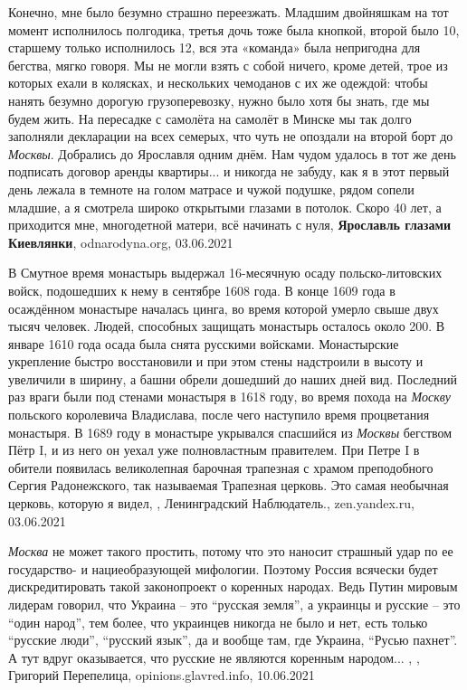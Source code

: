 Конечно, мне было безумно страшно переезжать. Младшим двойняшкам на тот момент
исполнилось полгодика, третья дочь тоже была кнопкой, второй было 10, старшему
только исполнилось 12, вся эта «команда» была непригодна для бегства, мягко
говоря. Мы не могли взять с собой ничего, кроме детей, трое из которых ехали в
колясках,  и нескольких чемоданов с их же одеждой: чтобы нанять безумно дорогую
грузоперевозку, нужно было хотя бы знать, где мы будем жить. На пересадке с
самолёта на самолёт в Минске мы так долго заполняли декларации на всех семерых,
что чуть не опоздали на второй борт до \emph{Москвы}. Добрались до Ярославля
одним днём. Нам чудом удалось в тот же день подписать договор аренды
квартиры... и никогда не забуду, как я в этот первый день лежала в темноте на
голом матрасе и чужой подушке, рядом сопели младшие, а я смотрела широко
открытыми глазами в потолок. Скоро 40 лет, а приходится мне, многодетной
матери, всё начинать с нуля,
\textbf{Ярославль глазами Киевлянки},
odnarodyna.org, 03.06.2021

В Смутное время монастырь выдержал 16-месячную осаду польско-литовских войск,
подошедших к нему в сентябре 1608 года. В конце 1609 года в осаждённом
монастыре началась цинга, во время которой умерло свыше двух тысяч человек.
Людей, способных защищать монастырь осталось около 200. В январе 1610 года
осада была снята русскими войсками. Монастырские укрепление быстро восстановили
и при этом стены надстроили в высоту и увеличили в ширину, а башни обрели
дошедший до наших дней вид. Последний раз враги были под стенами монастыря в
1618 году, во время похода на \emph{Москву} польского королевича Владислава,
после чего наступило время процветания монастыря. В 1689 году в монастыре
укрывался спасшийся из \emph{Москвы} бегством Пётр I, и из него он уехал уже
полновластным правителем. При Петре I в обители появилась великолепная барочная
трапезная с храмом преподобного Сергия Радонежского, так называемая Трапезная
церковь. Это самая необычная церковь, которую я видел,
, Ленинградский Наблюдатель., zen.yandex.ru, 03.06.2021

\emph{Москва} не может такого простить, потому что это наносит страшный удар по ее
государство- и нациеобразующей мифологии. Поэтому Россия всячески будет
дискредитировать такой законопроект о коренных народах. Ведь Путин мировым
лидерам говорил, что Украина – это \enquote{русская земля}, а украинцы и русские – это
\enquote{один народ}, тем более, что украинцев никогда не было и нет, есть только
\enquote{русские люди}, \enquote{русский язык}, да и вообще там, где Украина, \enquote{Русью пахнет}. А
тут вдруг оказывается, что русские не являются коренным народом... ,
, 
Григорий Перепелица, opinions.glavred.info, 10.06.2021

